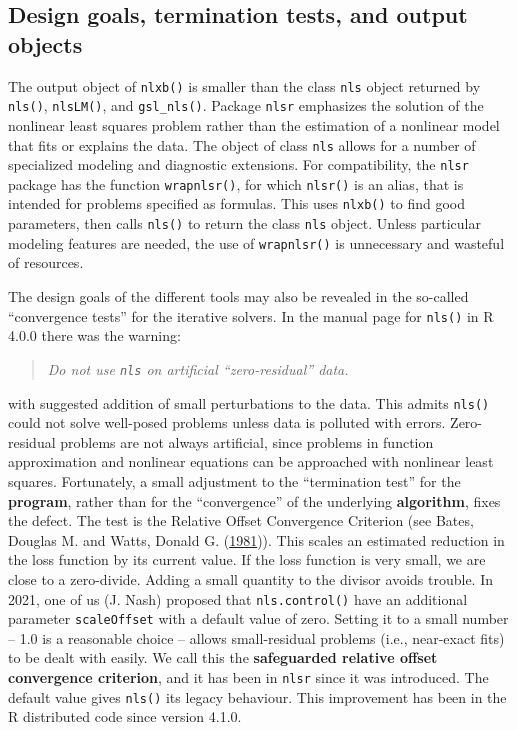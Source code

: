 \hypertarget{design-goals-termination-tests-and-output-objects}{%
\subsection{Design goals, termination tests, and output objects}\label{design-goals-termination-tests-and-output-objects}}

The output object of \texttt{nlxb()} is smaller than the class \texttt{nls} object returned
by \texttt{nls()}, \texttt{nlsLM()}, and \texttt{gsl\_nls()}. Package \texttt{nlsr} emphasizes the solution
of the nonlinear least squares problem rather than the estimation of a nonlinear
model that fits or explains the data. The object of class \texttt{nls} allows for
a number of specialized modeling and diagnostic extensions. For compatibility,
the \texttt{nlsr} package has the function \texttt{wrapnlsr()}, for which \texttt{nlsr()} is an alias,
that is intended for problems specified as formulas.
This uses \texttt{nlxb()} to find good parameters, then calls \texttt{nls()} to return the class
\texttt{nls} object. Unless particular modeling features are needed, the use of
\texttt{wrapnlsr()} is unnecessary and wasteful of resources.

The design goals of the different tools may also be revealed in the so-called
``convergence tests'' for the iterative solvers. In the manual page for \texttt{nls()}
in R 4.0.0 there was the warning:

\begin{quote}
\emph{Do not use \texttt{nls} on artificial ``zero-residual'' data.}
\end{quote}

with suggested addition of small perturbations to the data. This admits
\texttt{nls()} could not solve well-posed problems unless data is polluted
with errors. Zero-residual problems are not always artificial,
since problems in function approximation and nonlinear equations can be
approached with nonlinear least squares. Fortunately, a small adjustment
to the ``termination test'' for the \textbf{program}, rather than for the
``convergence'' of the underlying \textbf{algorithm}, fixes the defect. The test
is the Relative Offset Convergence
Criterion (see Bates, Douglas M. and Watts, Donald G. (\protect\hyperlink{ref-BatesWatts81}{1981})). This scales an estimated reduction in the loss
function by its current value. If the loss function is very small, we are close
to a zero-divide. Adding a small quantity to the divisor avoids trouble.
In 2021, one of us (J. Nash) proposed that \texttt{nls.control()} have an
additional parameter \texttt{scaleOffset} with a default value of zero. Setting it to a
small number -- 1.0 is a reasonable choice -- allows small-residual problems
(i.e., near-exact fits) to be dealt with easily. We call this the
\textbf{safeguarded relative offset convergence criterion}, and it has been in \texttt{nlsr}
since it was introduced. The default value
gives \texttt{nls()} its legacy behaviour. This improvement has been in the R distributed code
since version 4.1.0.

